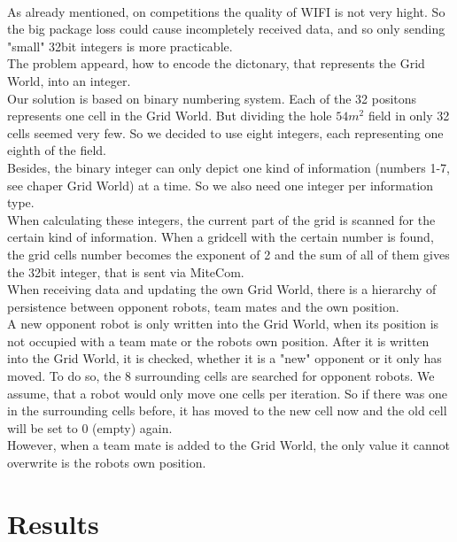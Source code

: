 \documentclass[lnicst,a4paper]{svmultln}
\begin{document}
\\
As already mentioned, on competitions the quality of WIFI is not very hight. So the big package loss could cause incompletely received data, and so only sending "small" 32bit integers is more practicable. 
\\
The problem appeard, how to encode the dictonary, that represents the Grid World, into an integer.
\\
Our solution is based on binary numbering system. Each of the 32 positons represents one cell in the Grid World. But dividing the hole $54m^2$ field in only 32 cells seemed very few. So we decided to use eight integers, each representing one eighth of the field.
\\
Besides, the binary integer can only depict one kind of information (numbers 1-7, see chaper Grid World) at a time. So we also need one integer per information type.
\\
When calculating these integers, the current part of the grid is scanned for the certain kind of information. When a gridcell with the certain number is found, the grid cells number becomes the exponent of 2 and the sum of all of them gives the 32bit integer, that is sent via MiteCom.
\\
When receiving data and updating the own Grid World, there is a hierarchy of persistence between opponent robots, team mates and the own position. 
\\
A new opponent robot is only written into the Grid World, when its position is not occupied with a team mate or the robots own position. After it is written into the Grid World, it is checked, whether it is a "new" opponent or it only has moved. To do so, the 8 surrounding cells are searched for opponent robots. We assume, that a robot would only move one cells per iteration. So if there was one in the surrounding cells before, it has moved to the new cell now and the old cell will be set to 0 (empty) again.
\\
However, when a team mate is added to the Grid World, the only value it cannot overwrite is the robots own position.


\section{Results}
\end{document}
